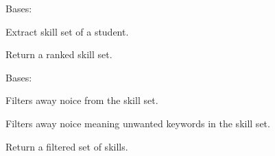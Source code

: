 \documentclass[letterpaper,10pt,english]{sphinxmanual}
\begin{document}
\begin{fulllineitems}
\label{cv_kickstarter:cv_kickstarter.academic_skill_set.StudentSkillSet}
Bases: 

Extract skill set of a student.

\begin{fulllineitems}
\label{cv_kickstarter:cv_kickstarter.academic_skill_set.StudentSkillSet.skill_set}
Return a ranked skill set.

\end{fulllineitems}


\end{fulllineitems}


\begin{fulllineitems}
\label{cv_kickstarter:cv_kickstarter.academic_skill_set.StudentSkillSetNoiceFilter}
Bases: 

Filters away noice from the skill set.

Filters away noice meaning unwanted keywords in the skill set.

\begin{fulllineitems}
\label{cv_kickstarter:cv_kickstarter.academic_skill_set.StudentSkillSetNoiceFilter.filtered_skill_set}
Return a filtered set of skills.

\end{fulllineitems}


\end{fulllineitems}

\end{document}
